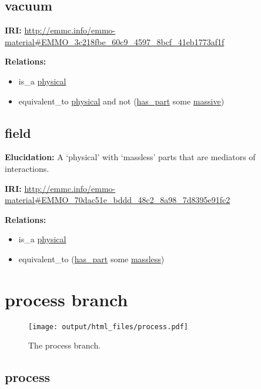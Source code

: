 \documentclass[a4paper,]{report}
\providecommand{\tightlist}{%
  \setlength{\itemsep}{0pt}\setlength{\parskip}{0pt}}
\begin{document}
\hypertarget{vacuum}{%
\subsection{vacuum}\label{vacuum}}

\textbf{IRI:}
\url{http://emmc.info/emmo-material\#EMMO_3c218fbe_60c9_4597_8bcf_41eb1773af1f}

\textbf{Relations:}

\begin{itemize}
\tightlist
\item
  is\_a \protect\hyperlink{physical}{physical}
\item
  equivalent\_to \protect\hyperlink{physical}{physical} and not
  (\protect\hyperlink{has_part}{has\_part} some
  \protect\hyperlink{massive}{massive})
\end{itemize}

\hypertarget{field}{%
\subsection{field}\label{field}}

\textbf{Elucidation:} A `physical' with `massless' parts that are
mediators of interactions.

\textbf{IRI:}
\url{http://emmc.info/emmo-material\#EMMO_70dac51e_bddd_48c2_8a98_7d8395e91fc2}

\textbf{Relations:}

\begin{itemize}
\tightlist
\item
  is\_a \protect\hyperlink{physical}{physical}
\item
  equivalent\_to (\protect\hyperlink{has_part}{has\_part} some
  \protect\hyperlink{massless}{massless})
\end{itemize}

\hypertarget{process-branch}{%
\section{process branch}\label{process-branch}}

\begin{figure}
\centering
\texttt{[image: output/html\_files/process.pdf]}
\caption{The process branch.}
\end{figure}

\hypertarget{process}{%
\subsection{process}\label{process}}
\end{document}
